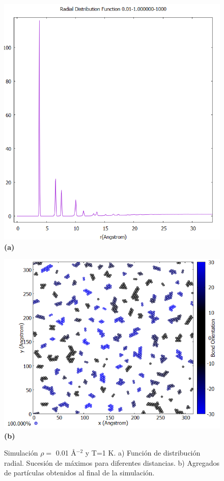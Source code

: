 \begin{figure}[H]
	\centering
	\begin{minipage}[b]{0.4\textwidth}
		\centering
		\includegraphics[width=1\textwidth]{grafico_3x08_0.01_1_rdf.png}
		\textbf{(a)}
	\end{minipage}%
	\hfill
	\begin{minipage}[b]{0.5\textwidth}
		\centering
		\includegraphics[width=1\textwidth]{grafico_3x09_0.01_1_dinamica.png}
		\textbf{(b)}
	\end{minipage}
	
	\caption{\footnotesize Simulación  $\rho=$ 0.01 \AA$^{-2}$ y  T=1 K. a) Función de distribución radial. Sucesión de máximos para diferentes distancias. b) Agregados de  partículas  obtenidos al final  de la simulación.}
	\label{fig:0.01t1}
\end{figure}

